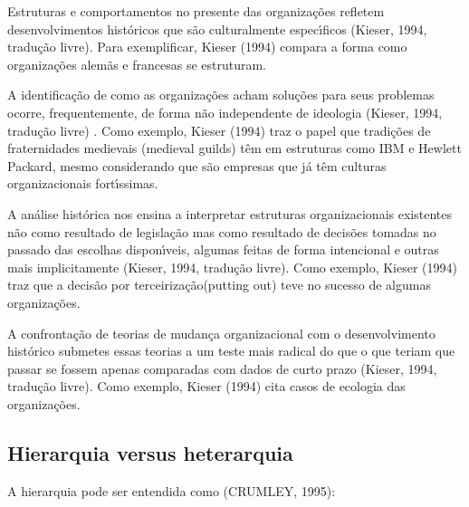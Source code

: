 \documentclass[
12pt,		%
openright,	%
twoside,  %
a4paper,			%
chapter=TITLE,		%
english,			%
french,				%
spanish,			%
brazil				%
]{USPSC-classe/USPSC}
\begin{document}
\begin{alineas}
\item Estruturas e comportamentos no presente das organiza\c{c}\~oes refletem desenvolvimentos hist\'oricos que s\~ao culturalmente espec\'{\i}ficos  (Kieser, 1994, tradu\c{c}\~ao livre). Para exemplificar,  Kieser (1994) compara a forma como organiza\c{c}\~oes alem\~as e francesas se estruturam.
\item A identifica\c{c}\~ao de como as organiza\c{c}\~oes acham solu\c{c}\~oes para seus problemas ocorre, frequentemente, de forma n\~ao independente de ideologia  (Kieser, 1994, tradu\c{c}\~ao livre) . Como exemplo,  Kieser (1994) traz o papel  que tradi\c{c}\~oes de fraternidades medievais (medieval guilds) t\^em em estruturas como IBM e Hewlett Packard, mesmo considerando que s\~ao empresas que j\'a t\^em culturas organizacionais fort\'{\i}ssimas.
\item A an\'alise hist\'orica nos ensina a interpretar estruturas organizacionais existentes n\~ao como resultado de legisla\c{c}\~ao mas como resultado de decis\~oes tomadas no passado das escolhas dispon\'{\i}veis, algumas feitas de forma intencional e outras mais implicitamente  (Kieser, 1994, tradu\c{c}\~ao livre). Como exemplo,  Kieser (1994) traz que a decis\~ao por \textquotedbl terceiriza\c{c}\~ao\textquotedbl  (putting out) teve no sucesso de algumas organiza\c{c}\~oes.
\item A confronta\c{c}\~ao de teorias de mudan\c{c}a organizacional com o desenvolvimento hist\'orico submetes essas teorias a um teste mais radical do que o que teriam que passar se fossem apenas comparadas com dados de curto prazo (Kieser, 1994, tradu\c{c}\~ao livre). Como exemplo,  Kieser (1994) cita casos de ecologia das organiza\c{c}\~oes.
\end{alineas}

\subsection[Hierarquia versus heterarquia]{Hierarquia versus heterarquia}\label{Hierarquia versus heterarquia}
A hierarquia pode ser entendida como (CRUMLEY, 1995):





\noindent\begin{center}\mbox{\centering{}}\end{center}
\end{document}
